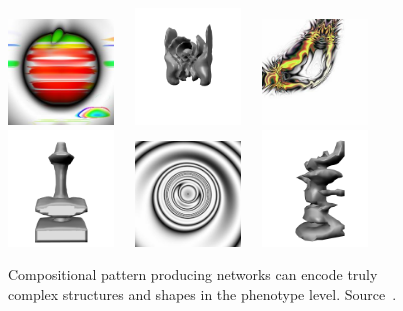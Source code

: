\begin{figure}
\centering
\includegraphics[width=0.25\textwidth]{../Figures/Misc/picBreed3.jpg}\  \   \   
\includegraphics[width=0.25\textwidth]{../Figures/Misc/endless2.png}\  \   \   
\includegraphics[width=0.25\textwidth]{../Figures/Misc/picBreed2.jpg}\\
\includegraphics[width=0.25\textwidth]{../Figures/Misc/endless1.png}\	\	\	
\includegraphics[width=0.25\textwidth]{../Figures/Misc/picBreed1.jpg}\	\	\	
\includegraphics[width=0.25\textwidth]{../Figures/Misc/endless3.png}
\caption{Compositional pattern producing networks can encode truly complex structures and shapes in the phenotype level. Source~\cite{picbreederSite}.}
\label{fig:cppnImages}
\end{figure}

